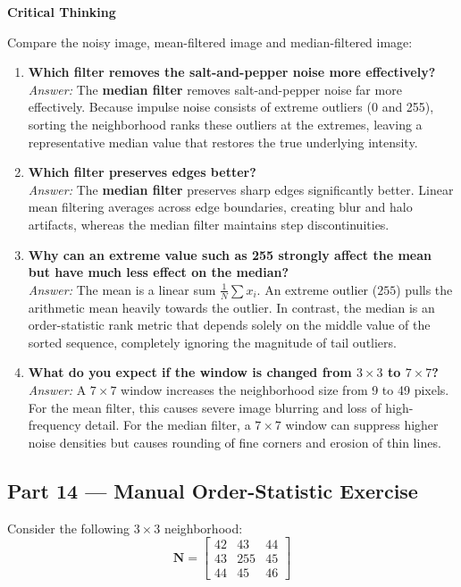 \documentclass[12pt]{article}
\begin{document}
\textbf{Critical Thinking}

Compare the noisy image, mean-filtered image and median-filtered image:
\begin{enumerate}
    \item \textbf{Which filter removes the salt-and-pepper noise more effectively?}\\
    \textit{Answer:} The \textbf{median filter} removes salt-and-pepper noise far more effectively. Because impulse noise consists of extreme outliers (0 and 255), sorting the neighborhood ranks these outliers at the extremes, leaving a representative median value that restores the true underlying intensity.
    
    \item \textbf{Which filter preserves edges better?}\\
    \textit{Answer:} The \textbf{median filter} preserves sharp edges significantly better. Linear mean filtering averages across edge boundaries, creating blur and halo artifacts, whereas the median filter maintains step discontinuities.
    
    \item \textbf{Why can an extreme value such as 255 strongly affect the mean but have much less effect on the median?}\\
    \textit{Answer:} The mean is a linear sum $\frac{1}{N}\sum x_i$. An extreme outlier ($255$) pulls the arithmetic mean heavily towards the outlier. In contrast, the median is an order-statistic rank metric that depends solely on the middle value of the sorted sequence, completely ignoring the magnitude of tail outliers.
    
    \item \textbf{What do you expect if the window is changed from $3\times3$ to $7\times7$?}\\
    \textit{Answer:} A $7\times7$ window increases the neighborhood size from 9 to 49 pixels. For the mean filter, this causes severe image blurring and loss of high-frequency detail. For the median filter, a $7\times7$ window can suppress higher noise densities but causes rounding of fine corners and erosion of thin lines.
\end{enumerate}

\subsection*{Part 14 — Manual Order-Statistic Exercise}
Consider the following $3\times3$ neighborhood:
\begin{equation}
\mathbf{N} = \begin{bmatrix} 42 & 43 & 44 \\ 43 & 255 & 45 \\ 44 & 45 & 46 \end{bmatrix}
\end{equation}
\end{document}
